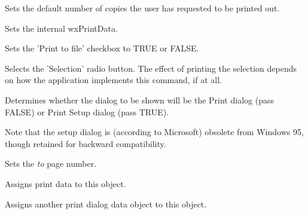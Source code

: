 Sets the default number of copies the user has requested to be printed out.

\label{wxprintdialogdatasetprintdata}


Sets the internal wxPrintData.

\label{wxprintdialogdatasetprinttofile}


Sets the 'Print to file' checkbox to TRUE or FALSE.

\label{wxprintdialogdatasetselection}


Selects the 'Selection' radio button. The effect of printing the selection depends on how the application
implements this command, if at all.

\label{wxprintdialogdatasetsetupdialog}


Determines whether the dialog to be shown will be the Print dialog
(pass FALSE) or Print Setup dialog (pass TRUE).

Note that the setup dialog is (according to Microsoft) obsolete from
Windows 95, though retained for backward compatibility.

\label{wxprintdialogdatasettopage}


Sets the {\it to} page number.

\label{wxprintdialogdataassign}


Assigns print data to this object.


Assigns another print dialog data object to this object.

\section{}\label{wxprinter}

